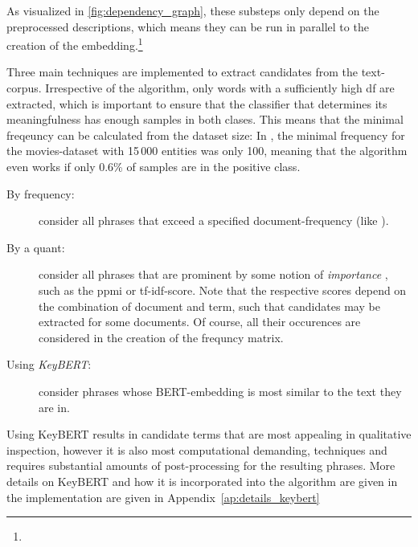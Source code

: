 As visualized in \autoref{fig:dependency_graph}, these substeps only depend on the preprocessed descriptions, which means they can be run in parallel to the creation of the embedding.\footnote{}

Three main techniques are implemented to extract candidates from the text-corpus. Irrespective of the algorithm, only words with a sufficiently high \gls{df} are extracted, which is important to ensure that the classifier that determines its meaningfulness has enough samples in both clases. This means that the minimal freqeuncy can be calculated from the dataset size: In \cite{Derrac2015}, the minimal frequency for the movies-dataset with 15\,000 entities was only 100, meaning that the algorithm even works if only 0.6\% of samples are in the positive class. 


\begin{description}
	\item[By frequency:] consider all phrases that exceed a specified document-frequency (like \cite{Derrac2015}).
	\item[By a \gls{quant}:] consider all phrases that are prominent by some notion of \textit{importance} , such as the \gls{ppmi} or \gls{tf-idf}-score. Note that the respective scores depend on the combination of document and term, such that candidates may be extracted for some documents. Of course, all their occurences are considered in the creation of the frequncy matrix.
	\item[Using \emph{KeyBERT}\cite{grootendorst2020keybert}:] consider phrases whose BERT-embedding \cite{Devlin2019} is most similar to the text they are in. 
\end{description}

Using KeyBERT results in candidate terms that are most appealing in qualitative inspection, however it is also most computational demanding, techniques and requires substantial amounts of post-processing for the resulting phrases. More details on KeyBERT and how it is incorporated into the algorithm are given in the implementation are given in Appendix~\ref{ap:details_keybert}

